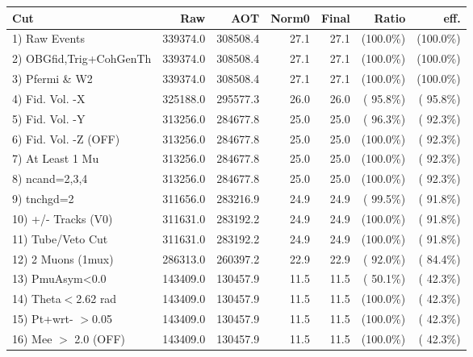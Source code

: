  \begin{table}[h!]\centering
 \begin{tabular}{||l||r|r|r|r|r|r||}
 \hline
 \hline
 Cut & Raw & AOT & Norm0 & Final & Ratio & eff.       \\
 \hline
  1) Raw Events           &     339374.0 &     308508.4 &         27.1 &         27.1 & (100.0\%) & (100.0\%) \\
  2) OBGfid,Trig+CohGenTh &     339374.0 &     308508.4 &         27.1 &         27.1 & (100.0\%) & (100.0\%) \\
  3) Pfermi \& W2         &     339374.0 &     308508.4 &         27.1 &         27.1 & (100.0\%) & (100.0\%) \\
  4) Fid. Vol. -X         &     325188.0 &     295577.3 &         26.0 &         26.0 & ( 95.8\%) & ( 95.8\%) \\
  5) Fid. Vol. -Y         &     313256.0 &     284677.8 &         25.0 &         25.0 & ( 96.3\%) & ( 92.3\%) \\
  6) Fid. Vol. -Z (OFF)   &     313256.0 &     284677.8 &         25.0 &         25.0 & (100.0\%) & ( 92.3\%) \\
  7) At Least 1 Mu        &     313256.0 &     284677.8 &         25.0 &         25.0 & (100.0\%) & ( 92.3\%) \\
  8) ncand=2,3,4          &     313256.0 &     284677.8 &         25.0 &         25.0 & (100.0\%) & ( 92.3\%) \\
  9) tnchgd=2             &     311656.0 &     283216.9 &         24.9 &         24.9 & ( 99.5\%) & ( 91.8\%) \\
 10) +/- Tracks (V0)      &     311631.0 &     283192.2 &         24.9 &         24.9 & (100.0\%) & ( 91.8\%) \\
 11) Tube/Veto Cut        &     311631.0 &     283192.2 &         24.9 &         24.9 & (100.0\%) & ( 91.8\%) \\
 12) 2 Muons (1mux)       &     286313.0 &     260397.2 &         22.9 &         22.9 & ( 92.0\%) & ( 84.4\%) \\
 13) PmuAsym<0.0          &     143409.0 &     130457.9 &         11.5 &         11.5 & ( 50.1\%) & ( 42.3\%) \\
 14) Theta$<$2.62 rad     &     143409.0 &     130457.9 &         11.5 &         11.5 & (100.0\%) & ( 42.3\%) \\
 15) Pt+wrt- $>$0.05      &     143409.0 &     130457.9 &         11.5 &         11.5 & (100.0\%) & ( 42.3\%) \\
 16) Mee $>$ 2.0  (OFF)   &     143409.0 &     130457.9 &         11.5 &         11.5 & (100.0\%) & ( 42.3\%) \\

\end{tabular}
\end{table}
